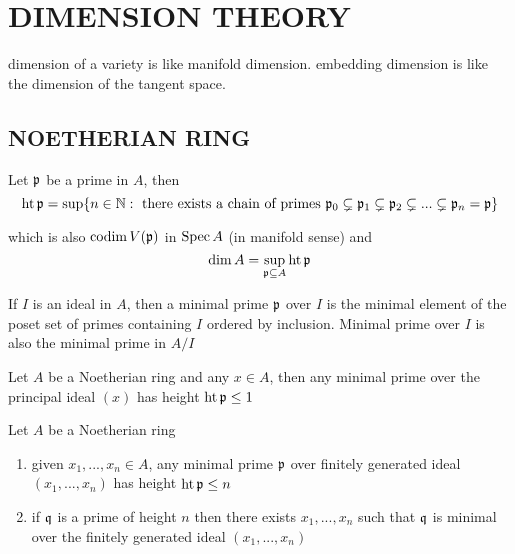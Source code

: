 \chapter{DIMENSION THEORY}

\begin{remark}
	dimension of a variety is like manifold dimension. embedding dimension is like the dimension of the tangent space.
	
\end{remark}

\section{NOETHERIAN RING}

\begin{definition}
	Let $\mathfrak{p}$ be a prime in $A$, then
	$$
		\operatorname{ht} \mathfrak{p} = \sup \{n \in \mathbb{N}: \text{ there exists a chain of primes } \mathfrak{p}_0 \subsetneq \mathfrak{p}_1 \subsetneq \mathfrak{p}_2 \subsetneq ... \subsetneq \mathfrak{p}_n = \mathfrak{p}\}
	$$
	
	which is also $\operatorname{codim} V(\mathfrak{p})$ in $\operatorname{Spec} A$ (in manifold sense) and
	$$
		\dim A = \sup_{\mathfrak{p} \subseteq A} \operatorname{ht} \mathfrak{p}
	$$
	
	If $I$ is an ideal in $A$, then a minimal prime $\mathfrak{p}$ over $I$ is the minimal element of the poset set of primes containing $I$ ordered by inclusion. Minimal prime over $I$ is also the minimal prime in $A / I$
\end{definition}

\begin{theorem}
	Let $A$ be a Noetherian ring and any $x \in A$, then any minimal prime over the principal ideal $(x)$ has height $\operatorname{ht} \mathfrak{p} \leq 1$
\end{theorem}

\begin{theorem}
	Let $A$ be a Noetherian ring
	\begin{enumerate}
		\item given $x_1, ..., x_n \in A$, any minimal prime $\mathfrak{p}$ over finitely generated ideal $(x_1, ..., x_n)$ has height $\operatorname{ht} \mathfrak{p} \leq n$
		
		\item if $\mathfrak{q}$ is a prime of height $n$ then there exists $x_1, ..., x_n$ such that $\mathfrak{q}$ is minimal over the finitely generated ideal $(x_1, ..., x_n)$
	\end{enumerate}
\end{theorem}

